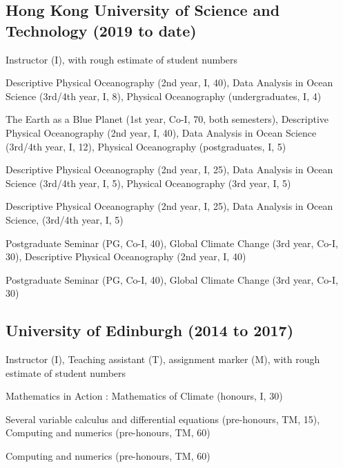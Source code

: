 \documentclass[letterpaper]{article}
\renewenvironment{itemize}{
  \begin{list}{}{
    \setlength{\leftmargin}{1.5em}
  }
}{
  \end{list}
}
\begin{document}
\subsection*{Hong Kong University of Science and Technology (2019 to date)}
\begin{itemize}
\item Instructor (I), with rough estimate of student numbers
\begin{itemize}
  \item[24/25:] Descriptive Physical Oceanography (2nd year, I, 40), Data Analysis in Ocean Science (3rd/4th year, I, 8), Physical Oceanography (undergraduates, I, 4)
  \item[23/24:] The Earth as a Blue Planet (1st year, Co-I, 70, both semesters), Descriptive Physical Oceanography (2nd year, I, 40), Data Analysis in Ocean Science (3rd/4th year, I, 12), Physical Oceanography (postgraduates, I, 5)
  \item[22/23:] Descriptive Physical Oceanography (2nd year, I, 25), Data Analysis in Ocean Science (3rd/4th year, I, 5), Physical Oceanography (3rd year, I, 5)
  \item[21/22:] Descriptive Physical Oceanography (2nd year, I, 25), Data Analysis in Ocean Science, (3rd/4th year, I, 5)
  \item[20/21:] Postgraduate Seminar (PG, Co-I, 40), Global Climate Change (3rd year, Co-I, 30), Descriptive Physical Oceanography (2nd year, I, 40)
  \item[19/20:] Postgraduate Seminar (PG, Co-I, 40), Global Climate Change (3rd year, Co-I, 30)
\end{itemize}
\end{itemize}

\subsection*{University of Edinburgh (2014 to 2017)}
\begin{itemize}
\item Instructor (I), Teaching assistant (T), assignment marker (M), with rough estimate of
student numbers
\begin{itemize}
  \item[16/17:] Mathematics in Action : Mathematics of Climate (honours, I, 30)
	\item[15/16:] Several variable calculus and differential equations
	(pre-honours, TM, 15), Computing and numerics (pre-honours, TM, 60)
	\item[14/15:] Computing and numerics (pre-honours, TM, 60)
\end{itemize}
\end{itemize}
\end{document}
